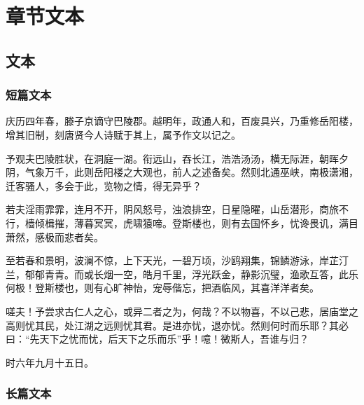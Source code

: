 \chapter{章节文本}

\section{文本}

\subsection{短篇文本}

庆历四年春，滕子京谪守巴陵郡。越明年，政通人和，百废具兴，乃重修岳阳楼，增其旧制，刻唐贤今人诗赋于其上，属予作文以记之。

予观夫巴陵胜状，在洞庭一湖。衔远山，吞长江，浩浩汤汤，横无际涯，朝晖夕阴，气象万千，此则岳阳楼之大观也，前人之述备矣。然则北通巫峡，南极潇湘，迁客骚人，多会于此，览物之情，得无异乎？

若夫淫雨霏霏，连月不开，阴风怒号，浊浪排空，日星隐曜，山岳潜形，商旅不行，樯倾楫摧，薄暮冥冥，虎啸猿啼。登斯楼也，则有去国怀乡，忧谗畏讥，满目萧然，感极而悲者矣。

至若春和景明，波澜不惊，上下天光，一碧万顷，沙鸥翔集，锦鳞游泳，岸芷汀兰，郁郁青青。而或长烟一空，皓月千里，浮光跃金，静影沉璧，渔歌互答，此乐何极！登斯楼也，则有心旷神怡，宠辱偕忘，把酒临风，其喜洋洋者矣。

嗟夫！予尝求古仁人之心，或异二者之为，何哉？不以物喜，不以己悲，居庙堂之高则忧其民，处江湖之远则忧其君。是进亦忧，退亦忧。然则何时而乐耶？其必曰：“先天下之忧而忧，后天下之乐而乐”乎！噫！微斯人，吾谁与归？

时六年九月十五日。

\subsection{长篇文本}

